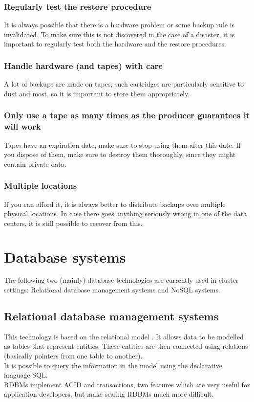 \documentclass[12pt]{report}
\begin{document}
\subsubsection{Regularly test the restore procedure}
It is always possible that there is a hardware problem or some backup
rule is invalidated. To make sure this is not discovered in the case
of a disaster, it is important to regularly test both the hardware and
the restore procedures.

\subsubsection{Handle hardware (and tapes) with care}
A lot of backups are made on tapes, such cartridges are particularly
sensitive to dust and most, so it is important to store them
appropriately.

\subsubsection{Only use a tape as many times as the producer
  guarantees it will work}
Tapes have an expiration date, make sure to stop using them after this
date. If you dispose of them, make sure to destroy them thoroughly,
since they might contain private data.

\subsubsection{Multiple locations}
If you can afford it, it is always better to distribute backups over
multiple physical locations. In case there goes anything seriously
wrong in one of the data centers, it is still possible to recover from
this.

\section{Database systems}
The following two (mainly) database technologies are currently used in cluster
settings: Relational database management systems and NoSQL systems.

\subsection{Relational database management systems}
This technology is based on the relational model \cite{codd}. It
allows data to be modelled as tables that represent entities. These
entities are then connected using relations (basically pointers from
one table to another).\\
It is possible to query the information in the model using the
declarative language SQL.\\
RDBMs implement ACID
and transactions, two features which are very
useful for application developers, but make scaling RDBMs much more difficult.
\end{document}
